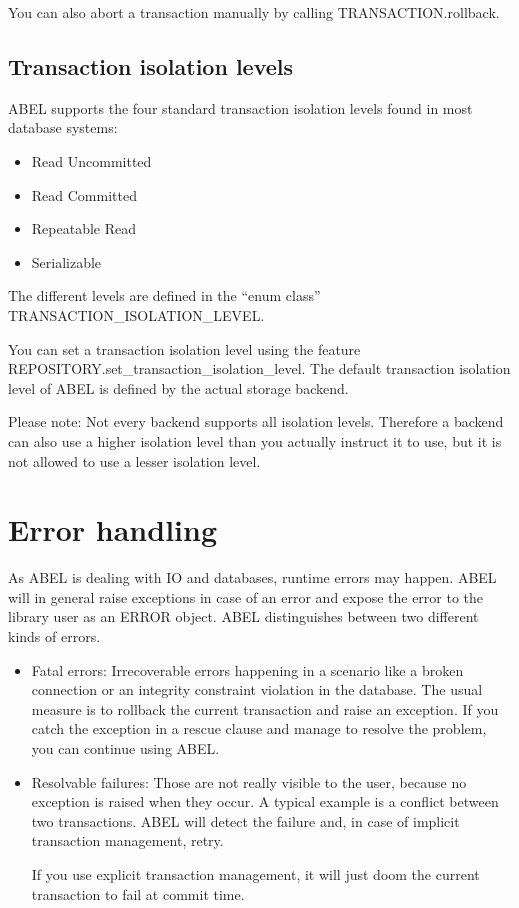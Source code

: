 You can also abort a transaction manually by calling TRANSACTION.rollback. 

\subsection{Transaction isolation levels}

ABEL supports the four standard transaction isolation levels found in most database systems:
\begin{itemize}
 \item Read Uncommitted
 \item Read Committed
 \item Repeatable Read
 \item Serializable
\end{itemize}

The different levels are defined in the ``enum class'' TRANSACTION\_\-ISOLATION\_LEVEL.

You can set a transaction isolation level using the feature REPOSITO\-RY.set\_\-transaction\_isolation\_level.
The default transaction isolation level of ABEL is defined by the actual storage backend.

Please note: Not every backend supports all isolation levels.
Therefore a backend can also use a higher isolation level than you actually instruct it to use, but it is not allowed to use a lesser isolation level.



\section{Error handling}

As ABEL is dealing with IO and databases, runtime errors may happen. 
ABEL will in general raise exceptions in case of an error and expose the error to the library user as an ERROR object.
ABEL distinguishes between two different kinds of errors.

\begin{itemize}

\item Fatal errors: Irrecoverable errors happening in a scenario like a broken connection or an integrity constraint violation in the database.
The usual measure is to rollback the current transaction and raise an exception. 
If you catch the exception in a rescue clause and manage to resolve the problem, you can continue using ABEL.

\item Resolvable failures: Those are not really visible to the user, because no exception is raised when they occur.
A typical example is a conflict between two transactions.
ABEL will detect the failure and, in case of implicit transaction management, retry.

If you use explicit transaction management, it will just doom the current transaction to fail at commit time.
\end{itemize}

